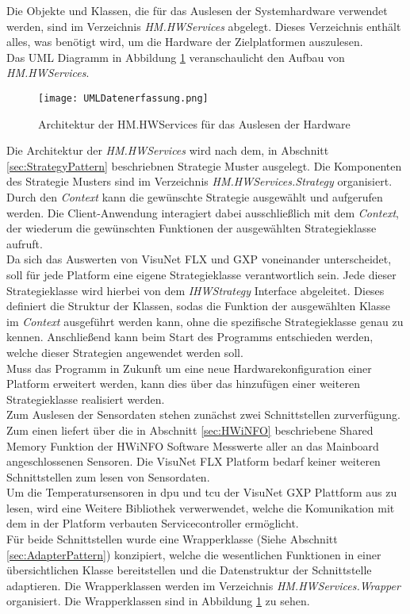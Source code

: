 Die Objekte und Klassen, die für das Auslesen der Systemhardware verwendet werden, sind im Verzeichnis \textit{HM.HWServices} abgelegt. Dieses Verzeichnis enthält alles, was benötigt wird, um die Hardware der Zielplatformen auszulesen.\\
Das UML Diagramm in Abbildung \ref{fig:HWServicesUML} veranschaulicht den Aufbau von \textit{HM.HWServices}. 
\begin{center}
    \begin{figure}[h!]
        \centering
        \texttt{[image: UMLDatenerfassung.png]}
        \caption{Architektur der HM.HWServices für das Auslesen der Hardware}
        \label{fig:HWServicesUML}
    \end{figure}
\end{center}
\vspace{-1.8cm}
Die Architektur der \textit{HM.HWServices} wird nach dem, in Abschnitt \ref{sec:StrategyPattern} beschriebnen Strategie Muster ausgelegt.
Die Komponenten des Strategie Musters sind im Verzeichnis \textit{HM.HWServices.Strategy} organisiert.\\
Durch den \textit{Context} kann die gewünschte Strategie ausgewählt und aufgerufen werden. Die Client-Anwendung interagiert dabei ausschließlich mit dem \textit{Context}, der wiederum die gewünschten Funktionen der ausgewählten Strategieklasse aufruft.\\  
Da sich das Auswerten von VisuNet FLX und GXP voneinander unterscheidet, soll für jede Platform eine eigene Strategieklasse verantwortlich sein. Jede dieser Strategieklasse wird hierbei von dem \textit{IHWStrategy} Interface abgeleitet. Dieses definiert die Struktur der Klassen, sodas die Funktion der ausgewählten Klasse im \textit{Context} ausgeführt werden kann, ohne die spezifische Strategieklasse genau zu kennen. Anschließend kann beim Start des Programms entschieden werden, welche dieser Strategien angewendet werden soll.\\
Muss das Programm in Zukunft um eine neue Hardwarekonfiguration einer Platform erweitert werden, kann dies über das hinzufügen einer weiteren Strategieklasse realisiert werden.\\
Zum Auslesen der Sensordaten stehen zunächst zwei Schnittstellen zurverfügung. Zum einen liefert über die in Abschnitt \ref{sec:HWiNFO} beschriebene Shared Memory Funktion der HWiNFO Software Messwerte aller an das Mainboard angeschlossenen Sensoren. Die VisuNet FLX Platform bedarf keiner weiteren Schnittstellen zum lesen von Sensordaten.\\
Um die Temperatursensoren in \ac{dpu} und \ac{tcu} der VisuNet GXP Plattform aus zu lesen, wird eine Weitere Bibliothek verwerwendet, welche die Komunikation mit dem in der Platform verbauten Servicecontroller ermöglicht.\\
Für beide Schnittstellen wurde eine Wrapperklasse (Siehe Abschnitt \ref{sec:AdapterPattern}) konzipiert, welche die wesentlichen Funktionen in einer übersichtlichen Klasse bereitstellen und die Datenstruktur der Schnittstelle adaptieren. Die Wrapperklassen werden im Verzeichnis \textit{HM.HWServices.Wrapper} organisiert. Die Wrapperklassen sind in Abbildung \ref{fig:HWServicesUML} zu sehen.
